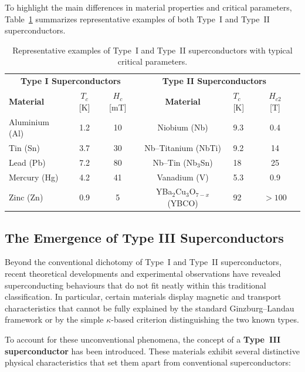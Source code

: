 To highlight the main differences in material properties and critical parameters, 
Table~\ref{tab:typeI_typeII_materials} summarizes representative examples of both Type~I and Type~II superconductors.

\begin{table}[H]
\centering
\renewcommand{\arraystretch}{1.2}
\setlength{\tabcolsep}{5pt}
\small
\begin{tabular}{lccc|lcc}
\hline
\multicolumn{3}{c|}{\textbf{Type I Superconductors}} & 
\multicolumn{3}{c}{\textbf{Type II Superconductors}} \\[2pt]
\textbf{Material} & $T_c$ [K] & $H_c$ [mT] &
\textbf{Material} & $T_c$ [K] & $H_{c2}$ [T] \\ 
\hline
Aluminium (Al)     & 1.2  & 10   & Niobium (Nb)          & 9.3   & 0.4  \\
Tin (Sn)           & 3.7  & 30   & Nb--Titanium (NbTi)   & 9.2   & 14   \\
Lead (Pb)          & 7.2  & 80   & Nb--Tin (Nb$_3$Sn)    & 18    & 25   \\
Mercury (Hg)       & 4.2  & 41   & Vanadium (V)          & 5.3   & 0.9  \\
Zinc (Zn)          & 0.9  & 5    & YBa$_2$Cu$_3$O$_{7-x}$ (YBCO) & 92 & $>100$ \\
\hline
\end{tabular}
\caption{
Representative examples of Type~I and Type~II superconductors with typical critical parameters. 
}
\label{tab:typeI_typeII_materials}
\end{table}


\subsection*{The Emergence of Type III Superconductors}
Beyond the conventional dichotomy of Type~I and Type~II superconductors, recent theoretical developments and experimental observations have revealed superconducting behaviours that do not fit neatly within this traditional classification.
In particular, certain materials display magnetic and transport characteristics that cannot be fully explained by the standard Ginzburg–Landau framework or by the simple $\kappa$-based criterion distinguishing the two known types.

To account for these unconventional phenomena, the concept of a \textbf{Type~III superconductor} has been introduced. These materials exhibit several distinctive physical characteristics that set them apart from conventional superconductors:

